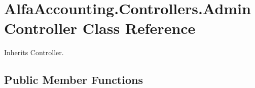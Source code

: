 \hypertarget{class_alfa_accounting_1_1_controllers_1_1_admin_controller}{}\section{Alfa\+Accounting.\+Controllers.\+Admin\+Controller Class Reference}
\label{class_alfa_accounting_1_1_controllers_1_1_admin_controller}


 




Inherits Controller.

\subsection*{Public Member Functions}
